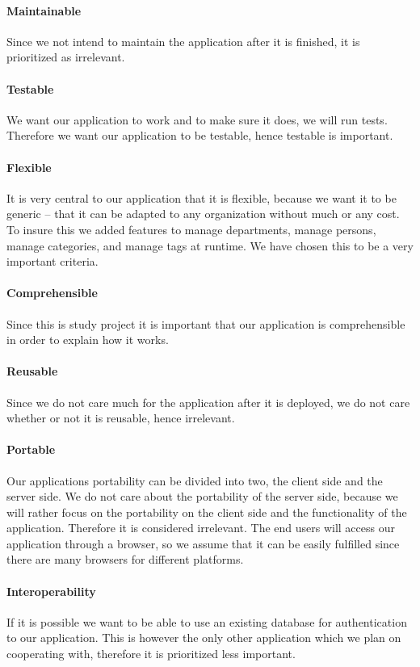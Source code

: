 \paragraph{Maintainable}
Since we not intend to maintain the application after it is finished, it is prioritized as irrelevant.
\paragraph{Testable}
We want our application to work and to make sure it does, we will run tests.
Therefore we want our application to be testable, hence testable is important. 
\paragraph{Flexible}
It is very central to our application that it is flexible, because we want it to be generic -- that it can be adapted to any organization without much or any cost. To insure this we added features to manage departments, manage persons, manage categories, and manage tags at runtime. We have chosen this to be a very important criteria.
\paragraph{Comprehensible}
Since this is study project it is important that our application is comprehensible in order to explain how it works. 
\paragraph{Reusable}
Since we do not care much for the application after it is deployed, we do not care whether or not it is reusable, hence irrelevant.
\paragraph{Portable}
Our applications portability can be divided into two, the client side and the server side.
We do not care about the portability of the server side, because we will rather focus on the portability on the client side and the functionality of the application.
Therefore it is considered irrelevant.
The end users will access our application through a browser, so we assume that it can be easily fulfilled since there are many browsers for different platforms. \cite{chrome10}\cite{firefox}
\paragraph{Interoperability}
If it is possible we want to be able to use an existing database for authentication to our application.
This is however the only other application which we plan on cooperating with, therefore it is prioritized less important.
